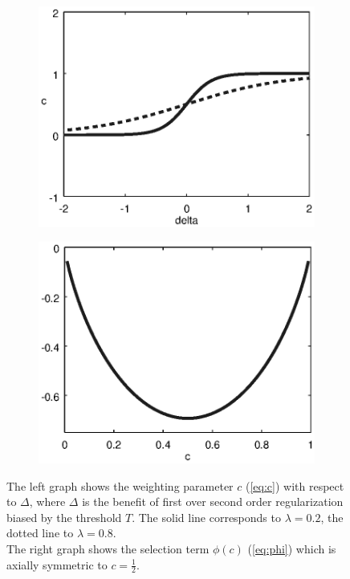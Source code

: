 \documentclass[journal]{vgtc}
\begin{document}
\begin{figure}[htb]
\centering
\begin{subfigure}{0.49\linewidth}
\centering
\includegraphics[width=\linewidth]{images/cofdelta.eps}
\end{subfigure}
\begin{subfigure}{0.49\linewidth}
\centering
\includegraphics[width=\linewidth]{images/selectionterm.eps}
\end{subfigure}
\caption{
The left graph shows the weighting parameter $c$ (\cref{eq:c}) with respect to $\Delta$, where $\Delta$ is the benefit of first over second order regularization biased by the threshold $T$.
The solid line corresponds to $\lambda=0.2$, the dotted line to $\lambda=0.8$.
\\
The right graph shows the selection term $\phi(c)$ (\cref{eq:phi}) which is axially symmetric to $c=\frac{1}{2}$.
}
\label{fig:c_phi}
\end{figure}
\end{document}
